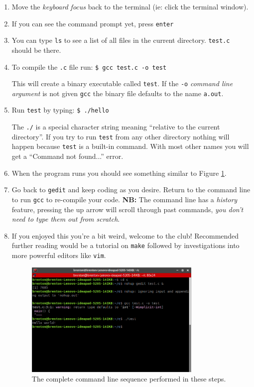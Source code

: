 \documentclass{lab}
\begin{document}
\begin{enumerate}
\item Move the \textit{keyboard focus} back to the terminal (ie: click the terminal window).

\item If you can see the command prompt yet, press \texttt{enter}

\item You can type \texttt{ls} to see a list of all files in the current directory. \texttt{test.c} should be there.

\item To compile the \texttt{.c} file run: \texttt{\$ gcc test.c -o test}

This will create a binary executable called \texttt{test}. If the \texttt{-o} \textit{command line argument} is not given \texttt{gcc} the binary file defaults to the name \texttt{a.out}.

\item Run \texttt{test} by typing: \texttt{\$ ./hello}

The \texttt{./} is a special character string meaning ``relative to the current directory''. If you try to run \texttt{test} from any other directory nothing will happen because \texttt{test} is a built-in command. With most other names you will get a ``Command not found...'' error.

\item When the program runs you should see something similar to Figure \ref{fig:c_ubuntu}.

\item Go back to \texttt{gedit} and keep coding as you desire. Return to the command line to run \texttt{gcc} to re-compile your code. \textbf{NB:} The command line has a \textit{history} feature, pressing the up arrow will scroll through past commands, \textit{you don't need to type them out from scratch}.

\item If you enjoyed this you're a bit weird, welcome to the club! Recommended further reading would be a tutorial on \texttt{make} followed by investigations into more powerful editors like \texttt{vim}.

\begin{figure}[H]
\begin{center}
\includegraphics[width=0.8\textwidth]{c_ubuntu.png}
\end{center}
\caption{The complete command line sequence performed in these steps.}\label{fig:c_ubuntu}
\end{figure}


\end{enumerate}
\end{document}
